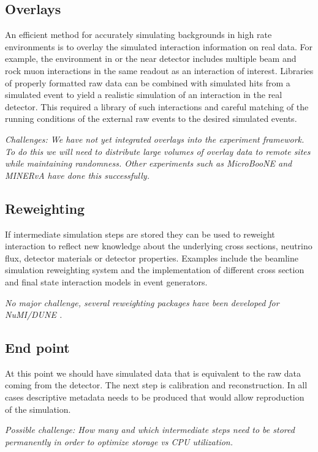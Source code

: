 \documentclass[../main-v1.tex]{subfiles}
\begin{document}
\subsection{Overlays}
An efficient method for accurately simulating backgrounds in high rate environments is to overlay the simulated interaction information on real data.  For example, the environment in  or the near detector includes multiple beam and rock muon interactions in the same readout as an interaction of interest.  Libraries of properly formatted raw data can be combined with simulated hits from a simulated event to yield a realistic simulation of an interaction in the real detector. This required a library of such interactions and careful matching of the running conditions of the external raw events to the desired simulated events. 

{\it Challenges: We have not yet integrated overlays into the experiment framework. To do this we will need to distribute large volumes of overlay data to remote sites while maintaining randomness. Other experiments such as MicroBooNE and MINERvA have done this successfully. }

\subsection{Reweighting}
If intermediate simulation steps  are stored they can be used to reweight interaction to reflect new knowledge about the underlying cross sections, neutrino flux, detector materials or detector properties. Examples include the  beamline simulation reweighting system and the implementation of different cross section and final state interaction models in event generators. 

{\it No major challenge, several reweighting packages have been developed for NuMI/DUNE \cite{Aliaga:2015wva, Calcutt:2021zck}.}

\subsection{End point}
At this point we should have simulated data that is equivalent to the raw data coming from the detector. The next step is calibration and reconstruction. In all cases descriptive metadata needs to be produced that would allow reproduction of the simulation. 

{\it Possible challenge:  How many and which intermediate steps need to be stored permanently in order to optimize storage vs CPU utilization.}
\end{document}
